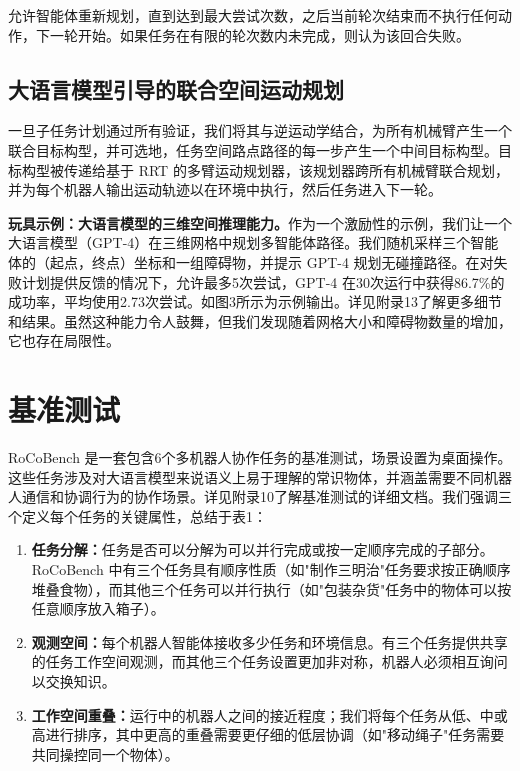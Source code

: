 \documentclass[UTF8, a4paper, 12pt]{article}
\begin{document}
允许智能体重新规划，直到达到最大尝试次数，之后当前轮次结束而不执行任何动作，下一轮开始。如果任务在有限的轮次数内未完成，则认为该回合失败。

\subsection{大语言模型引导的联合空间运动规划}

一旦子任务计划通过所有验证，我们将其与逆运动学结合，为所有机械臂产生一个联合目标构型，并可选地，任务空间路点路径的每一步产生一个中间目标构型。目标构型被传递给基于 RRT 的多臂运动规划器，该规划器跨所有机械臂联合规划，并为每个机器人输出运动轨迹以在环境中执行，然后任务进入下一轮。

\textbf{玩具示例：大语言模型的三维空间推理能力。}作为一个激励性的示例，我们让一个大语言模型（GPT-4）在三维网格中规划多智能体路径。我们随机采样三个智能体的（起点，终点）坐标和一组障碍物，并提示 GPT-4 规划无碰撞路径。在对失败计划提供反馈的情况下，允许最多5次尝试，GPT-4 在30次运行中获得86.7\%的成功率，平均使用2.73次尝试。如图3所示为示例输出。详见附录13了解更多细节和结果。虽然这种能力令人鼓舞，但我们发现随着网格大小和障碍物数量的增加，它也存在局限性。

\section{基准测试}

RoCoBench 是一套包含6个多机器人协作任务的基准测试，场景设置为桌面操作。这些任务涉及对大语言模型来说语义上易于理解的常识物体，并涵盖需要不同机器人通信和协调行为的协作场景。详见附录10了解基准测试的详细文档。我们强调三个定义每个任务的关键属性，总结于表1：

\begin{enumerate}
    \item \textbf{任务分解：}任务是否可以分解为可以并行完成或按一定顺序完成的子部分。RoCoBench 中有三个任务具有顺序性质（如"制作三明治"任务要求按正确顺序堆叠食物），而其他三个任务可以并行执行（如"包装杂货"任务中的物体可以按任意顺序放入箱子）。
    
    \item \textbf{观测空间：}每个机器人智能体接收多少任务和环境信息。有三个任务提供共享的任务工作空间观测，而其他三个任务设置更加非对称，机器人必须相互询问以交换知识。
    
    \item \textbf{工作空间重叠：}运行中的机器人之间的接近程度；我们将每个任务从低、中或高进行排序，其中更高的重叠需要更仔细的低层协调（如"移动绳子"任务需要共同操控同一个物体）。
\end{enumerate}
\end{document}
